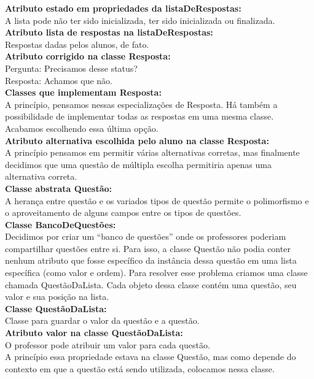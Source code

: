 \documentclass[12pt,letterpaper]{article}
\begin{document}
\textbf{Atributo estado em propriedades da listaDeRespostas:}\\
A lista pode não ter sido inicializada, ter sido inicializada ou finalizada.\\

\textbf{Atributo lista de respostas na listaDeRespostas:}\\
Respostas dadas pelos alunos, de fato.\\

\textbf{Atributo corrigido na classe Resposta: }\\
Pergunta: Precisamos desse status?\\
Resposta: Achamos que não.\\

\textbf{Classes que implementam Resposta:}\\
A princípio, pensamos nessas especializações de Resposta. Há também a possibilidade de implementar todas as respostas em uma mesma classe. Acabamos escolhendo essa última opção.\\

\textbf{Atributo alternativa escolhida pelo aluno na classe Resposta:}\\
A princípio pensamos em permitir várias alternativas corretas, mas finalmente decidimos que uma questão de múltipla escolha permitiria apenas uma alternativa correta.\\

\textbf{Classe abstrata Questão:}\\
A herança entre questão e os variados tipos de questão permite o polimorfismo e o aproveitamento de alguns campos entre os tipos de questões.\\

\textbf{Classe BancoDeQuestões:}\\
Decidimos por criar um “banco de questões” onde os professores poderiam compartilhar questões entre si. Para isso, a classe Questão não podia conter nenhum atributo que fosse específico da instância dessa questão em uma lista específica (como valor e ordem). Para resolver esse problema criamos uma classe chamada QuestãoDaLista. Cada objeto dessa classe contém uma questão, seu valor e sua posição na lista.\\

\textbf{Classe QuestãoDaLista:}\\
Classe para guardar o valor da questão e a questão.\\

\textbf{Atributo valor na classe QuestãoDaLista:}\\
O professor pode atribuir um valor para cada questão.\\
A princípio essa propriedade estava na classe Questão, mas como depende do contexto em que a questão está sendo utilizada, colocamos nessa classe.\\
\end{document}
